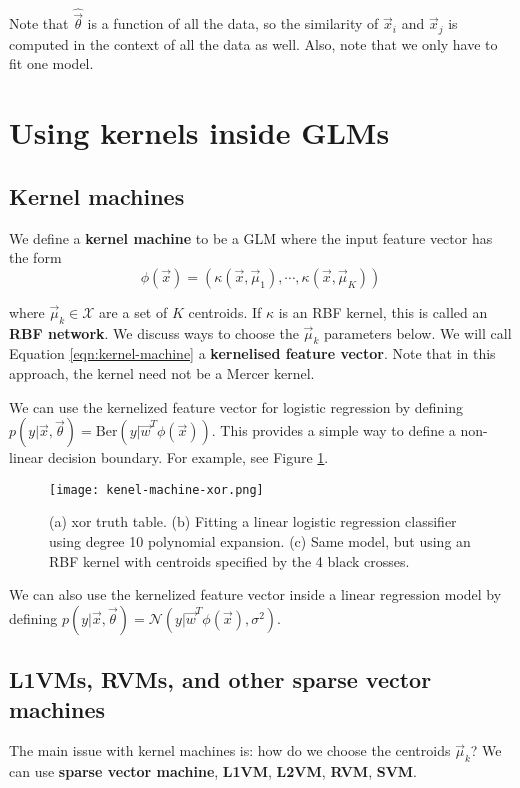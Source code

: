 Note that $\hat{\vec{\theta}}$ is a function of all the data, so the similarity of $\vec{x}_i$ and $\vec{x}_j$ is computed in the context of all the data as well. Also, note that we only have to fit one model.


\section{Using kernels inside GLMs}


\subsection{Kernel machines}
We define a \textbf{kernel machine} to be a GLM where the input feature vector has the form
\begin{equation}\label{eqn:kernel-machine}
\phi(\vec{x})=(\kappa(\vec{x},\vec{\mu}_1),\cdots,\kappa(\vec{x},\vec{\mu}_K))
\end{equation}

where $\vec{\mu}_k \in \mathcal{X}$ are a set of $K$ centroids. If $\kappa$ is an RBF kernel, this is called an \textbf{RBF network}. We discuss ways to choose the $\vec{\mu}_k$ parameters below. We will call Equation \eqref{eqn:kernel-machine} a \textbf{kernelised feature vector}. Note that in this approach, the kernel need not be a Mercer kernel.

We can use the kernelized feature vector for logistic regression by defining $p(y|\vec{x},\vec{\theta})=\mathrm{Ber}(y|\vec{w}^T\phi(\vec{x}))$. This provides a simple way to define a non-linear decision boundary. For example, see Figure \ref{fig:kenel-machine-xor}.

\begin{figure}[hbtp]
\centering
    \texttt{[image: kenel-machine-xor.png]}
\caption{(a) xor truth table. (b) Fitting a linear logistic regression classifier using degree 10 polynomial expansion. (c) Same model, but using an RBF kernel with centroids specified by the 4 black crosses.}
\label{fig:kenel-machine-xor} 
\end{figure}

We can also use the kernelized feature vector inside a linear regression model by defining $p(y|\vec{x},\vec{\theta})=\mathcal{N}(y|\vec{w}^T\phi(\vec{x}),\sigma^2)$. 


\subsection{L1VMs, RVMs, and other sparse vector machines}
\label{sec:sparse-kernel-machines}
The main issue with kernel machines is: how do we choose the centroids $\vec{\mu}_k$? We can use \textbf{sparse vector machine}, \textbf{L1VM}, \textbf{L2VM}, \textbf{RVM}, \textbf{SVM}.

